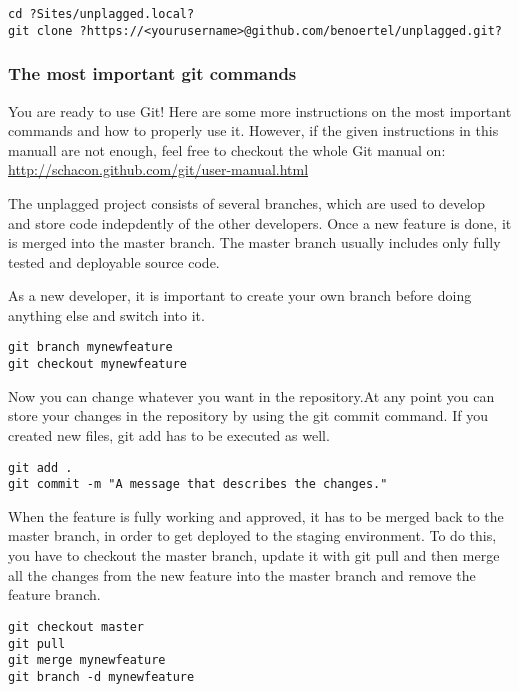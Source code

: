 \begin{lstlisting}[caption=Cloning a repository]
cd ?Sites/unplagged.local?
git clone ?https://<yourusername>@github.com/benoertel/unplagged.git?
\end{lstlisting}

\subsubsection{The most important git commands}

You are ready to use Git! Here are some more instructions on the most important commands and how to properly use it. 
However, if the given instructions in this manuall are not enough, feel free to checkout the whole Git manual on: 
\url{http://schacon.github.com/git/user-manual.html}

The unplagged project consists of several branches, which are used to develop and store code indepdently of the other 
developers. Once a new feature is done, it is merged into the master branch. The master branch usually includes only 
fully tested and deployable source code. 

As a new developer, it is important to create your own branch before doing anything else and switch into it.

\begin{lstlisting}[caption=Creating branches]
git branch mynewfeature
git checkout mynewfeature
\end{lstlisting}

Now you can change whatever you want in the repository.At any point you can store your changes in the repository by using the git commit command. If you created new files, git add has to be executed as well.

\begin{lstlisting}[caption=Creating branches]
git add .
git commit -m "A message that describes the changes."
\end{lstlisting}

When the feature is fully working and approved, it has to be merged back to the master branch, in order to get deployed 
to the staging environment. To do this, you have to checkout the master branch, update it with git pull and then merge 
all the changes from the new feature into the master branch and remove the feature branch.

\begin{lstlisting}[caption=Creating branches]
git checkout master
git pull
git merge mynewfeature
git branch -d mynewfeature
\end{lstlisting}

